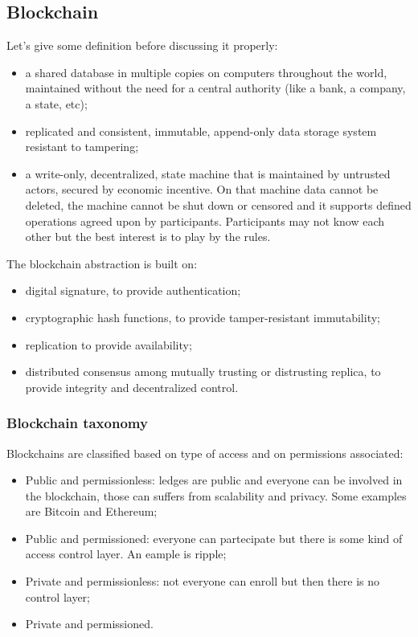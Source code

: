 \subsection{Blockchain}
Let's give some definition before discussing it properly:
\begin{itemize}
    \item a shared database in multiple copies on computers throughout the world, maintained without the need for a central authority (like a bank, a company, a state, etc);
    \item replicated and consistent, immutable, append-only data storage system resistant to tampering;
    \item a write-only, decentralized, state machine that is maintained by untrusted actors, secured by economic incentive. On that machine data cannot be deleted, the machine cannot be shut down or censored and it supports defined operations agreed upon by participants.
    Participants may not know each other but the best interest is to play by the rules.
\end{itemize}

The blockchain abstraction is built on:
\begin{itemize}
    \item digital signature, to provide authentication;
    \item cryptographic hash functions, to provide tamper-resistant immutability;
    \item replication to provide availability;
    \item distributed consensus among mutually trusting or distrusting replica, to provide integrity and decentralized control.
\end{itemize}

\subsubsection{Blockchain taxonomy}
Blockchains are classified based on type of access and on permissions associated:
\begin{itemize}
    \item Public and permissionless: ledges are public and everyone can be involved in the blockchain, those can suffers from scalability and privacy. Some examples are Bitcoin and Ethereum;

    \item Public and permissioned: everyone can partecipate but there is some kind of access control layer. An eample is ripple;

    \item Private and permissionless: not everyone can enroll but then there is no control layer;

    \item Private and permissioned.
\end{itemize}

